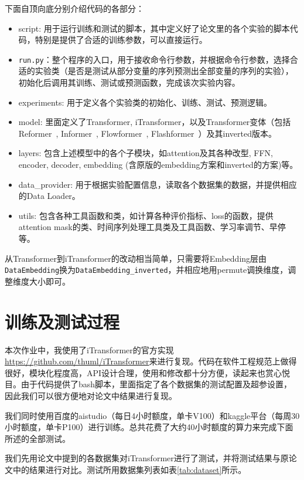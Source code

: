 \documentclass[twoside,12pt]{article}
\begin{document}
下面自顶向底分别介绍代码的各部分：
\begin{itemize}
  \item script: 用于运行训练和测试的脚本，其中定义好了论文里的各个实验的脚本代码，特别是提供了合适的训练参数，可以直接运行。
  \item \verb |run.py|：整个程序的入口，用于接收命令行参数，并根据命令行参数，选择合适的实验类（是否是测试从部分变量的序列预测出全部变量的序列的实验），初始化后调用其训练、测试或预测函数，完成该次实验内容。
  \item experiments: 用于定义各个实验类的初始化、训练、测试、预测逻辑。
  \item model: 里面定义了Transformer, iTransformer，以及Transformer变体（包括Reformer~\citep{kitaev2020reformer}, Informer~\citep{Informer}, Flowformer~\citep{wu2022flowformer}, Flashformer~\citep{dao2022flashattention}）及其inverted版本。
  \item layers: 包含上述模型中的各个子模块，如attention及其各种改型, FFN, encoder, decoder, embedding (含原版的embedding方案和inverted的方案)等。
  \item data\_provider: 用于根据实验配置信息，读取各个数据集的数据，并提供相应的Data Loader。
  \item utils: 包含各种工具函数和类，如计算各种评价指标、loss的函数，提供attention mask的类、时间序列处理工具类及工具函数、学习率调节、早停等。
\end{itemize}

从Transformer到iTransformer的改动相当简单，只需要将Embedding层由\verb |DataEmbedding|换为\verb |DataEmbedding_inverted|，并相应地用permute调换维度，调整维度大小即可。

\section{训练及测试过程}

本次作业中，我使用了iTransformer的官方实现\url{https://github.com/thuml/iTransformer}来进行复现。代码在软件工程规范上做得很好，模块化程度高，API设计合理，使用和修改都十分方便，读起来也赏心悦目。由于代码提供了bash脚本，里面指定了各个数据集的测试配置及超参设置，因此我们可以很方便地对论文中结果进行复现。

我们同时使用百度的aistudio（每日4小时额度，单卡V100）和kaggle平台（每周30小时额度，单卡P100）进行训练。总共花费了大约40小时额度的算力来完成下面所述的全部测试。

我们先用论文中提到的各数据集对iTransformer进行了测试，并将测试结果与原论文中的结果进行对比。测试所用数据集列表如表\ref{tab:dataset}所示。
\end{document}
